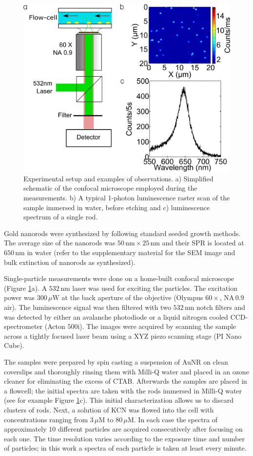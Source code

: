 \documentclass[a4paper,oneside,onecolumn]{article}
\newcommand{\nm}{\ensuremath{\,\textrm{nm}}}
\newcommand{\uM}{\ensuremath{\,\mu\textrm{M}}}
\newcommand{\uW}{\ensuremath{\,\mu\textrm{W}}}
\begin{document}
\begin{figure}[p]
 \centering \includegraphics[width=0.45\linewidth]{Figures/01_Setup/setup_1.png}
 \caption{Experimental setup and examples of observations. a) Simplified
 schematic of the confocal microscope employed during the measurements. b) A
 typical 1-photon luminescence raster scan of the sample immersed in
 water, before etching and c) luminescence spectrum of a single rod.}
 \label{fig:setup}
\end{figure}

Gold nanorods were synthesized by following standard seeded growth
methods\cite{Nikoobakht2003}. The average size of the nanorods was $50\nm\times
25\nm$ and their SPR is located at $650\nm$ in water (refer to the
supplementary material for the SEM image and bulk extinction of nanorods as
synthesized).

Single-particle measurements were done on a home-built confocal microscope
(Figure \ref{fig:setup}a). A $532\nm$ laser was used for exciting the particles.
The excitation power was $300\uW$ at the back aperture of the objective
(Olympus $60\times$, $\textrm{NA}\,0.9$ air). The luminescence signal was then
filtered with two $532\nm$ notch filters and was detected by either an avalanche
photodiode or a liquid nitrogen cooled CCD-spectrometer (Acton $500\textrm{i}$).
The images were acquired by scanning the sample across a tightly focused laser
beam using a XYZ piezo scanning stage (PI Nano Cube).

The samples were prepared by spin casting a suspension of AuNR on clean
coverslips and thoroughly rinsing them  with Milli-Q water and placed in an
ozone cleaner for eliminating the excess of CTAB. Afterwards the samples are
placed in a flowcell; the initial spectra are taken with the rods immersed in
Milli-Q water (see for example Figure \ref{fig:setup}c). This initial
characterization allows us to discard clusters of rods\cite{Funston2009}.
Next, a solution of KCN was flowed into the cell with concentrations ranging
from $3\uM$ to $80\uM$. In each case the spectra of approximately $10$
different particles are acquired consecutively after focusing on each one. The
time resolution varies according to the exposure time and number of particles;
in this work a spectra of each particle is taken at least every minute.
\end{document}
